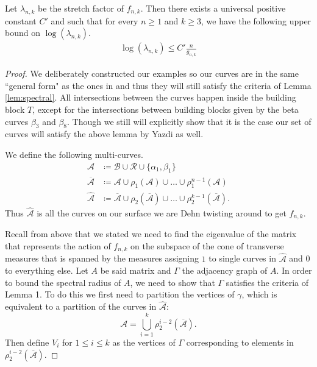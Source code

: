 \begin{lem}
  Let $\lambda_{n,k}$ be the stretch factor of $f_{n,k}$. Then there exists a universal positive constant $C'$
  and such that for every $n \geq 1$ and $k \geq 3$, we have the following upper bound on $\log(\lambda_{n,k})$.
  \begin{align*}
   \log(\lambda_{n,k}) \leq C'\frac{n}{g_{n,k}}
  \end{align*}
\end{lem}

\begin{proof}
  We deliberately constructed our examples so our curves are in the same ``general form" as the ones in
  \cite{yazdi2018pseudo} and thus they will still satisfy the criteria of Lemma \ref{lem:spectral}. All
  intersections between the curves happen inside the building block $T$, except for the intersections between
  building blocks given by the beta curves $\beta_3$ and $\beta_8$. Though we still will explicitly show that
  it is the case our set of curves will satisfy the above lemma by Yazdi as well.

  We define the following multi-curves.
\begin{align*}
  \mathcal{A} &\coloneqq \mathcal{B} \cup \mathcal{R} \cup \{\alpha_1,\beta_1\} \\
  \overline{\mathcal{A}} &\coloneqq \mathcal{A} \cup \rho_1(\mathcal{A}) \cup \dots \cup \rho_1^{n-1}(\mathcal{A}) \\
  \widehat{\mathcal{A}} &\coloneqq \overline{\mathcal{A}} \cup \rho_2\left(\overline{\mathcal{A}}\right) \cup \dots \cup \rho_2^{k-1}\left(\overline{\mathcal{A}}\right).
\end{align*}
Thus $\hat{\mathcal{A}}$ is all the curves on our surface we are Dehn twisting around to get $f_{n,k}$.

Recall from above that we stated we need to find the eigenvalue of the matrix that represents the action of
$f_{n,k}$ on the subspace of the cone of transverse measures that is spanned by the measures assigning $1$ to
single curves in $\hat{\mathcal{A}}$ and 0 to everything else. Let $A$ be said matrix and $\Gamma$ the
adjacency graph of $A$. In order to bound the spectral radius of $A$, we need to show that $\Gamma$ satisfies
the criteria of Lemma 1. To do this we first need to partition the vertices of $\gamma$, which is equivalent
to a partition of the curves in $\hat{\mathcal{A}}$:
$$\mathcal{A} = \bigcup_{i=1}^k \rho_2^{i-2}(\overline{\mathcal{A}}).$$ Then define $V_i$ for
$1 \leq i \leq k$ as the vertices of $\Gamma$ corresponding to elements in
$\rho_2^{i-2}(\overline{\mathcal{A}})$.


\end{proof}
